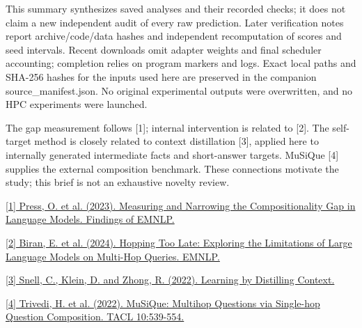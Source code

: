 \documentclass[10pt,a4paper]{article}
\newcommand{\reportheading}[1]{\par\vspace{5pt}{\color{teal}\bfseries\large #1}\par\vspace{2pt}}
\begin{document}
{\small\color{muted} This summary synthesizes saved analyses and their recorded checks; it does not claim a new independent audit of every raw prediction. Later verification notes report archive/code/data hashes and independent recomputation of scores and seed intervals. Recent downloads omit adapter weights and final scheduler accounting; completion relies on program markers and logs. Exact local paths and SHA-256 hashes for the inputs used here are preserved in the companion source\_manifest.json. No original experimental outputs were overwritten, and no HPC experiments were launched.\par}
\reportheading{Position in the literature}
{\small\color{muted} The gap measurement follows [1]; internal intervention is related to [2]. The self-target method is closely related to context distillation [3], applied here to internally generated intermediate facts and short-answer targets. MuSiQue [4] supplies the external composition benchmark. These connections motivate the study; this brief is not an exhaustive novelty review.\par}
{\small\color{muted} \href{https://aclanthology.org/2023.findings-emnlp.378/}{[1] Press, O. et al. (2023). Measuring and Narrowing the Compositionality Gap in Language Models. Findings of EMNLP.}\par}
{\small\color{muted} \href{https://arxiv.org/abs/2406.12775}{[2] Biran, E. et al. (2024). Hopping Too Late: Exploring the Limitations of Large Language Models on Multi-Hop Queries. EMNLP.}\par}
{\small\color{muted} \href{https://arxiv.org/abs/2209.15189}{[3] Snell, C., Klein, D. and Zhong, R. (2022). Learning by Distilling Context.}\par}
{\small\color{muted} \href{https://aclanthology.org/2022.tacl-1.31/}{[4] Trivedi, H. et al. (2022). MuSiQue: Multihop Questions via Single-hop Question Composition. TACL 10:539-554.}\par}
\end{document}
